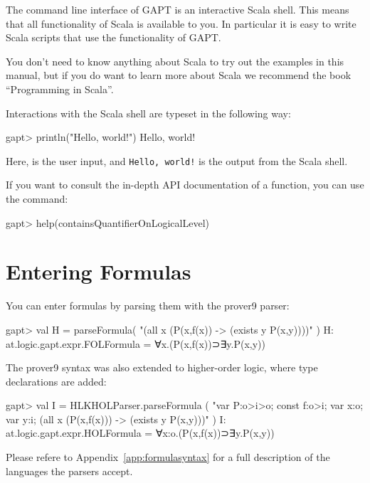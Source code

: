 \documentclass[a4paper,11pt]{article}
\newcommand{\cli}[1]{{\ttfamily {#1}}}
\begin{document}
The command line interface of GAPT is an interactive Scala shell.  This means
that all functionality of Scala is available to you.  In particular it is easy
to write Scala scripts that use the functionality of GAPT.

You don't need to know anything about Scala to try out the examples in this
manual, but if you do want to learn more about Scala we recommend the book
``Programming in Scala''\cite{odersky2008programming}.

Interactions with the Scala shell are typeset in the following way:
\begin{clilisting}
gapt> println("Hello, world!")
Hello, world!

\end{clilisting}
Here, {\bfseries \cli{println("Hello, world!")}} is the user input, and \texttt{Hello,
world!} is the output from the Scala shell.

If you want to consult the in-depth API documentation of a function, you can
use the \cli{help} command:
\begin{clilisting}
gapt> help(containsQuantifierOnLogicalLevel)

\end{clilisting}

\section{Entering Formulas}\label{sec.entering_formulas}
You can enter formulas by parsing them with the prover9\cite{Prover9Input} parser:
%
\begin{clilisting}
gapt> val H = parseFormula( "(all x (P(x,f(x)) -> (exists y P(x,y))))" )
H: at.logic.gapt.expr.FOLFormula = ∀x.(P(x,f(x))⊃∃y.P(x,y))

\end{clilisting}
%
The prover9 syntax was also extended to higher-order logic, where type declarations are added:
%
\begin{clilisting}
gapt> val I = HLKHOLParser.parseFormula ( "var P:o>i>o; const f:o>i; var x:o; var y:i; (all x (P(x,f(x))) -> (exists y P(x,y)))" )
I: at.logic.gapt.expr.HOLFormula = ∀x:o.(P(x,f(x))⊃∃y.P(x,y))

\end{clilisting}

Please refere to Appendix~\ref{app:formulasyntax} for a full description of the languages the parsers accept.
\end{document}
